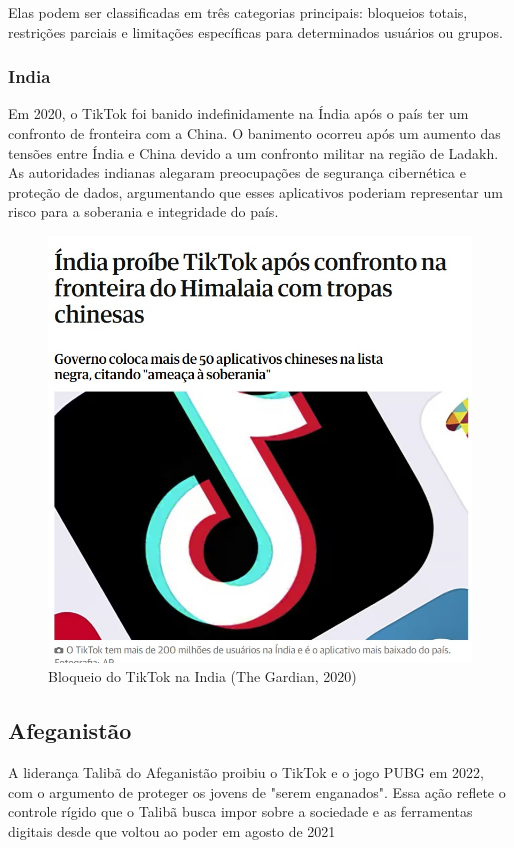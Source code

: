 Elas podem ser classificadas em três categorias principais: bloqueios totais, restrições parciais e limitações específicas para determinados usuários ou grupos.


\subsubsection{India}

Em 2020, o TikTok foi banido indefinidamente na Índia após o país ter um confronto de fronteira com a China. O banimento ocorreu após um aumento das tensões entre Índia e China devido a um confronto militar na região de Ladakh. As autoridades indianas alegaram preocupações de segurança cibernética e proteção de dados, argumentando que esses aplicativos poderiam representar um risco para a soberania e integridade do país.
\vskip0.3cm

\begin{figure}[H]
    \centering
    \includegraphics[width=0.7\linewidth]{TIKTOK1.jpg}
    \caption{Bloqueio do TikTok na India (The Gardian, 2020)}
    \label{fig:enter-label} 
\end{figure}


\subsection{Afeganistão}

A liderança Talibã do Afeganistão proibiu o TikTok e o jogo PUBG em 2022, com o argumento de proteger os jovens de "serem enganados". Essa ação reflete o controle rígido que o Talibã busca impor sobre a sociedade e as ferramentas digitais desde que voltou ao poder em agosto de 2021


